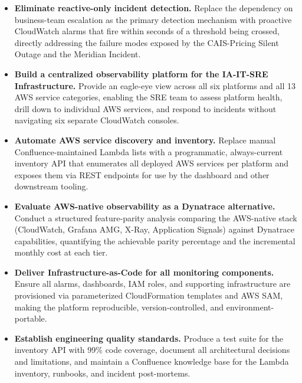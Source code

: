 \begin{itemize}

    \item \textbf{Eliminate reactive-only incident detection.} Replace the
          dependency on business-team escalation as the primary detection
          mechanism with proactive CloudWatch alarms that fire within seconds
          of a threshold being crossed, directly addressing the failure modes
          exposed by the CAIS-Pricing Silent Outage and the Meridian Incident.

    \item \textbf{Build a centralized observability platform for the IA-IT-SRE
          Infrastructure.} Provide an eagle-eye view across all six
          platforms and all 13 AWS service categories, enabling the SRE team
          to assess platform health, drill down to individual AWS services, and
          respond to incidents without navigating six separate CloudWatch consoles.

    \item \textbf{Automate AWS service discovery and inventory.} Replace manual
          Confluence-maintained Lambda lists with a programmatic, always-current
          inventory API that enumerates all deployed AWS services per platform
          and exposes them via REST endpoints for use by the dashboard and other
          downstream tooling.

    \item \textbf{Evaluate AWS-native observability as a Dynatrace alternative.}
          Conduct a structured feature-parity analysis comparing the AWS-native
          stack (CloudWatch, Grafana AMG, X-Ray, Application Signals) against
          Dynatrace capabilities, quantifying the achievable parity percentage
          and the incremental monthly cost at each tier.

    \item \textbf{Deliver Infrastructure-as-Code for all monitoring components.}
          Ensure all alarms, dashboards, IAM roles, and supporting infrastructure
          are provisioned via parameterized CloudFormation templates and AWS SAM,
          making the platform reproducible, version-controlled, and
          environment-portable.

    \item \textbf{Establish engineering quality standards.} Produce a test suite
          for the inventory API with 99\% code coverage, document all
          architectural decisions and limitations, and maintain a Confluence
          knowledge base for the Lambda inventory, runbooks, and incident
          post-mortems.

\end{itemize}

